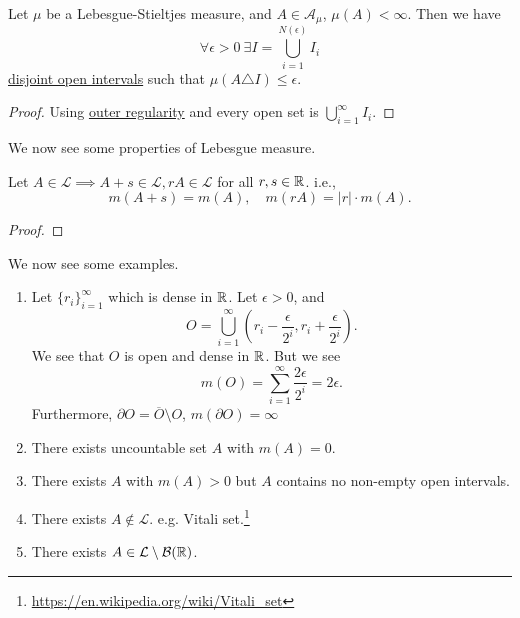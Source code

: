 \begin{proposition}
	Let \(\mu \) be a Lebesgue-Stieltjes measure, and \(A\in \mathcal{A} _\mu \), \(\mu (A)<\infty \). Then we have
	\[
		\forall \epsilon >0\ \exists I = \bigcup\limits_{i=1}^{N(\epsilon )} I_{i}
	\]
	\underline{disjoint open intervals} such that \(\mu (A\triangle  I)\leq \epsilon \).
\end{proposition}
\begin{proof}
	Using \hyperref[thm:outer-regularity]{outer regularity} and every open set is \(\bigcup\limits_{i=1}^{\infty} I_{i}\).
\end{proof}

We now see some properties of Lebesgue measure.

\begin{theorem}
	Let \(A\in \mathcal{L} \implies A + s\in \mathcal{L}, rA\in\mathcal{L}  \) for all \(r, s\in\mathbb{\MakeUppercase{r}} \). i.e.,
	\[
		m(A+s) = m(A),\quad m(rA) = \left\vert r \right\vert \cdot m(A).
	\]
\end{theorem}
\begin{proof}
\end{proof}

\begin{eg}
	We now see some examples.
	\begin{enumerate}
		\item Let \(\{r_{i}\}_{i=1}^{\infty}\) which is dense in \(\mathbb{\MakeUppercase{r}} \). Let \(\epsilon >0\), and
		      \[
			      O = \bigcup\limits_{i=1}^{\infty} \left(r_{i} - \frac{\epsilon}{2^i}, r_{i} + \frac{\epsilon}{2^i}\right).
		      \]
		      We see that \(O\) is open and dense in \(\mathbb{\MakeUppercase{r}} \). But we see
		      \[
			      m(O) = \sum\limits_{i=1}^{\infty} \frac{2\epsilon }{2^i} = 2\epsilon.
		      \]
		      Furthermore, \(\partial O = \overline{O} \setminus O\), \(m(\partial O) = \infty \)
		\item There exists uncountable set \(A\) with \(m(A)=0\).
		\item There exists \(A\) with \(m(A)>0\) but \(A\) contains no non-empty open intervals.
		\item There exists \(A\notin \mathcal{L} \). e.g. Vitali set.\footnote{\url{https://en.wikipedia.org/wiki/Vitali_set}}
		\item There exists \(A\in\mathcal{L} \setminus \mathcal{B} (\mathbb{\MakeUppercase{r}} )\).
	\end{enumerate}
\end{eg}